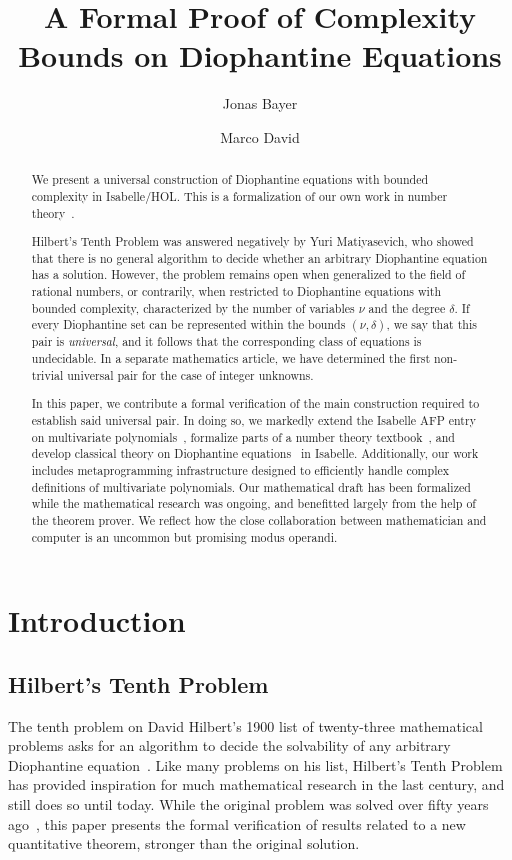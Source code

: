 \documentclass[a4paper,USenglish,cleveref,autoref,thm-restate]{lipics-v2021}
\title{A Formal Proof of Complexity Bounds on Diophantine Equations}
\author{Jonas Bayer}{Department of Pure Mathematics and Mathematical Statistics, University of Cambridge, UK}{jcb234@cam.ac.uk}{https://orcid.org/0009-0006-2500-3146}{}
\author{Marco David}{Department of Physics, University of California, Berkeley, US}{mdv@berkeley.edu}{https://orcid.org/0000-0001-5673-5389}{}
\begin{document}
\maketitle

\begin{abstract}
We present a universal construction of Diophantine equations with bounded complexity in Isabelle/HOL. This is a formalization of our own work in number theory~\cite{manuscript}.

Hilbert's Tenth Problem was answered negatively by Yuri Matiyasevich, who showed that there is no general algorithm to decide whether an arbitrary Diophantine equation has a solution. However, the problem remains open when generalized to the field of rational numbers, or contrarily, when restricted to Diophantine equations with bounded complexity, characterized by the number of variables $\nu$ and the degree $\delta$. If every Diophantine set can be represented within the bounds $(\nu, \delta)$, we say that this pair is \emph{universal}, and it follows that the corresponding class of equations is undecidable. In a separate mathematics article, we have determined the first non-trivial universal pair for the case of integer unknowns. 

In this paper, we contribute a formal verification of the main construction required to establish said universal pair. In doing so, we markedly extend the Isabelle AFP entry on multivariate polynomials~\cite{polynomials-afp}, formalize parts of a number theory textbook~\cite{nathanson}, and develop classical theory on Diophantine equations~\cite{MR75} in Isabelle. Additionally, our work includes metaprogramming infrastructure designed to efficiently handle complex definitions of multivariate polynomials. Our mathematical draft has been formalized while the mathematical research was ongoing, and benefitted largely from the help of the theorem prover. We reflect how the close collaboration between mathematician and computer is an uncommon but promising modus operandi.
\end{abstract}

\section{Introduction}
\subsection{Hilbert's Tenth Problem}
The tenth problem on David Hilbert's 1900 list of twenty-three mathematical problems asks for an algorithm to decide the solvability of any arbitrary Diophantine equation~\cite{hilbert-problems}. Like many problems on his list, Hilbert's Tenth Problem has provided inspiration for much mathematical research in the last century, and still does so until today. While the original problem was solved over fifty years ago~\cite{exp-diophantine}, this paper presents the formal verification of results related to a new quantitative theorem, stronger than the original solution.
\end{document}
